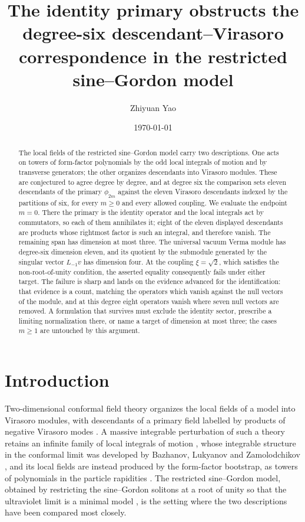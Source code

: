 \documentclass[11pt,reqno]{amsart}
\title[The identity primary at degree six]{The identity primary obstructs the
  degree-six descendant--Virasoro correspondence in the restricted
  sine--Gordon model}
\author{Zhiyuan Yao}
\date{\today}
\theoremstyle{plain}
\theoremstyle{definition}
\theoremstyle{remark}
\numberwithin{equation}{section}
\begin{document}
\begin{abstract}
The local fields of the restricted sine--Gordon model carry two descriptions.
One acts on towers of form-factor polynomials by the odd local integrals of
motion and by transverse generators; the other organizes descendants into
Virasoro modules. These are conjectured to agree degree by degree, and at
degree six the comparison sets eleven descendants of the primary
$\phi_{2m}$ against the eleven Virasoro descendants indexed by the partitions
of six, for every $m\ge0$ and every allowed coupling. We evaluate the
endpoint $m=0$. There the primary is the identity operator and the local
integrals act by commutators, so each of them annihilates it; eight of the
eleven displayed descendants are products whose rightmost factor is such an
integral, and therefore vanish. The remaining span has dimension at most
three. The universal vacuum Verma module has degree-six dimension eleven, and
its quotient by the submodule generated by the singular vector $L_{-1}v$ has
dimension four. At the coupling $\xi=\sqrt2$, which satisfies the
non-root-of-unity condition, the asserted equality consequently fails under
either target. The failure is sharp and lands on the evidence advanced for the
identification: that evidence is a count, matching the operators which vanish
against the null vectors of the module, and at this degree eight operators
vanish where seven null vectors are removed. A formulation that survives must
exclude the identity sector, prescribe a limiting normalization there, or name
a target of dimension at most three; the cases $m\ge1$ are untouched by this
argument.
\end{abstract}

\maketitle

\section{Introduction}
\label{sec:introduction}

Two-dimensional conformal field theory organizes the local fields of a model
into Virasoro modules, with descendants of a primary field labelled by
products of negative Virasoro modes \cite{Belavin_1984ic}. A massive
integrable perturbation of such a theory retains an infinite family of local
integrals of motion \cite{Zamolodchikov_1987hi,Zamolodchikov_1989if}, whose
integrable structure in the conformal limit was developed by Bazhanov,
Lukyanov and Zamolodchikov \cite{Bazhanov_1996is,Bazhanov_1997is,
Bazhanov_1999is}, and its local
fields are instead produced by the form-factor bootstrap, as towers of
polynomials in the particle rapidities \cite{Smirnov_Book}. The restricted
sine--Gordon model, obtained by restricting the sine--Gordon solitons at a
root of unity so that the ultraviolet limit is a minimal model
\cite{Leclair_1989rs,Smirnov_1990ro,Bernard_1990rq}, is the setting where the
two descriptions have been compared most closely.
\end{document}
